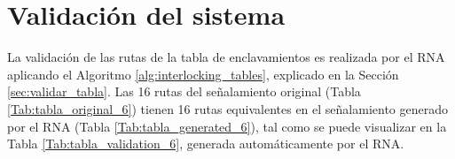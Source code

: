 \section{Validación del sistema}

    La validación de las rutas de la tabla de enclavamientos es realizada por el RNA aplicando el Algoritmo \ref{alg:interlocking_tables}, explicado en la Sección \ref{sec:validar_tabla}. Las 16 rutas del señalamiento original (Tabla \ref{Tab:tabla_original_6}) tienen 16 rutas equivalentes en el señalamiento generado por el RNA (Tabla \ref{Tab:tabla_generated_6}), tal como se puede visualizar en la Tabla \ref{Tab:tabla_validation_6}, generada automáticamente por el RNA.

    \begin{table}[H]
        {
        \caption{Equivalencias entre las rutas originales y las generadas por el RNA.}
        \label{Tab:tabla_validation_6}
        \centering
            \begin{center}
\end{center}}
\end{table}
